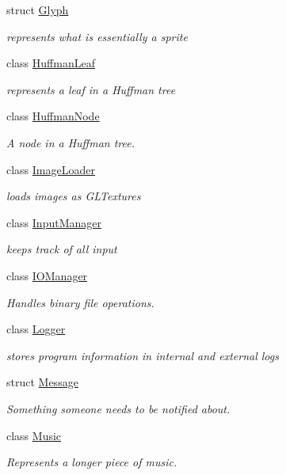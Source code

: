 \begin{DoxyCompactItemize}
struct \hyperlink{structnta_1_1Glyph}{Glyph}
\begin{DoxyCompactList}\small\item\em represents what is essentially a sprite \end{DoxyCompactList}\item 
class \hyperlink{classnta_1_1HuffmanLeaf}{Huffman\+Leaf}
\begin{DoxyCompactList}\small\item\em represents a leaf in a Huffman tree \end{DoxyCompactList}\item 
class \hyperlink{classnta_1_1HuffmanNode}{Huffman\+Node}
\begin{DoxyCompactList}\small\item\em A node in a Huffman tree. \end{DoxyCompactList}\item 
class \hyperlink{classnta_1_1ImageLoader}{Image\+Loader}
\begin{DoxyCompactList}\small\item\em loads images as G\+L\+Textures \end{DoxyCompactList}\item 
class \hyperlink{classnta_1_1InputManager}{Input\+Manager}
\begin{DoxyCompactList}\small\item\em keeps track of all input \end{DoxyCompactList}\item 
class \hyperlink{classnta_1_1IOManager}{I\+O\+Manager}
\begin{DoxyCompactList}\small\item\em Handles binary file operations. \end{DoxyCompactList}\item 
class \hyperlink{classnta_1_1Logger}{Logger}
\begin{DoxyCompactList}\small\item\em stores program information in internal and external logs \end{DoxyCompactList}\item 
struct \hyperlink{structnta_1_1Message}{Message}
\begin{DoxyCompactList}\small\item\em Something someone needs to be notified about. \end{DoxyCompactList}\item 
class \hyperlink{classnta_1_1Music}{Music}
\begin{DoxyCompactList}\small\item\em Represents a longer piece of music. \end{DoxyCompactList}\item 

\end{DoxyCompactItemize}
